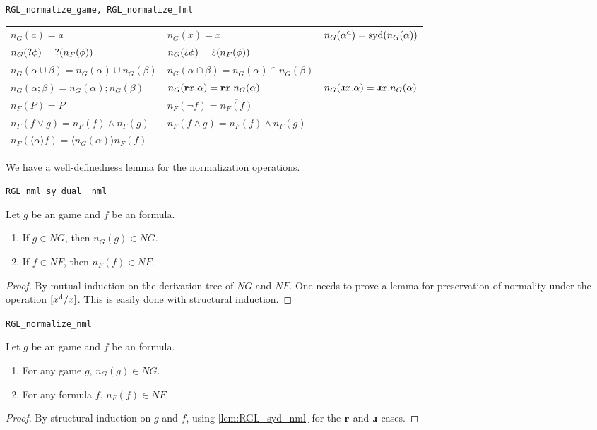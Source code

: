 \begin{bdefinition}
\texttt{RGL\_normalize\_game, RGL\_normalize\_fml}

\begin{tabular}{l l l}
  $n_G(a)=a$ 
  & $n_G(x)=x$ 
  & $n_G(\alpha^\text{d})= \operatorname{syd}(n_G(\alpha))$ \\
   $n_G(\text{?} \phi)= \text{?}(n_F(\phi))$ 
   & $n_G(\DTest \phi)= \DTest(n_F(\phi))$ \\
   $n_G(\alpha\cup\beta)=n_G(\alpha)\cup n_G(\beta)$ 
   & $n_G(\alpha\cap\beta)=n_G(\alpha)\cap n_G(\beta)$ \\
   $n_G(\alpha ; \beta) = n_G(\alpha);n_G(\beta)$
   & $n_G(\textbf{r} x.\alpha)= \textbf{r} x.n_G(\alpha)$ 
   & $n_G(\DRec x.\alpha)= \DRec x.n_G(\alpha)$ \\
   $n_F(P) = P$
   & $n_F(\neg f) = \overline{n_F(f)}$ \\
    $n_F(f\vee g) = n_F(f)\wedge n_F(g)$ 
   & $n_F(f\wedge g) = n_F(f)\wedge n_F(g)$ \\
   $n_F(\langle\alpha\rangle f) = \langle n_G(\alpha)\rangle n_F(f)$
\end{tabular}
\end{bdefinition}

We have a well-definedness lemma for the normalization operations.

\begin{blemma} \texttt{RGL\_nml\_sy\_dual\_\_nml}
\label{lem:RGL_syd_nml}

Let $g$ be an \RGL{} game and $f$ be an \RGL{} formula.

\begin{enumerate} 
    \item If $g\in NG$, then $n_G(g)\in NG$.
    \item If $f\in NF$, then $n_F(f)\in NF$.
\end{enumerate}
\end{blemma}
\begin{proof}
By mutual induction on the derivation tree of $NG$ and $NF$. One needs to prove a lemma for preservation of normality under the operation $[x^\text{d}/x]$. This is easily done with structural induction.
\end{proof}

\begin{blemma} \texttt{RGL\_normalize\_nml}

Let $g$ be an \RGL{} game and $f$ be an \RGL{} formula.
\label{lem:RGL_normalize_nml}
\begin{enumerate} 
    \item For any \RGL{} game $g$, $n_G(g)\in NG$.
    \item For any \RGL{} formula $f$, $n_F(f)\in NF$.
\end{enumerate}
\end{blemma}
\begin{proof}
    By structural induction on $g$ and $f$, using \autoref{lem:RGL_syd_nml} for the $\textbf{r}$ and $\DRec$ cases.
\end{proof}

